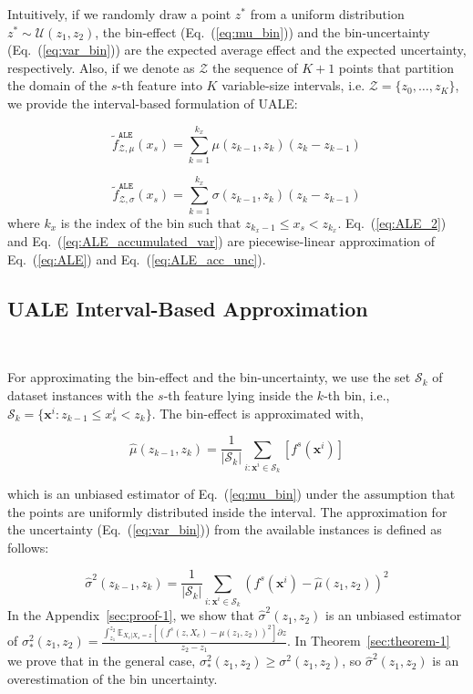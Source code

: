 \documentclass[twoside]{article}
\newcommand{\dfdx}{f^s}
\begin{document}
%
Intuitively, if we randomly draw a point \(z^*\) from a uniform
distribution \(z^* \sim \mathcal{U}(z_1, z_2)\), the bin-effect
(Eq.~(\ref{eq:mu_bin})) and the bin-uncertainty
(Eq.~(\ref{eq:var_bin})) are the expected average effect and the
expected uncertainty, respectively. Also, if we denote as
\(\mathcal{Z}\) the sequence of \(K+1\) points that partition the
domain of the \(s\)-th feature into \(K\) variable-size intervals,
i.e.  \(\mathcal{Z} = \{z_0, \ldots, z_K\}\), we provide the
interval-based formulation of UALE:

\begin{equation}
  \label{eq:ALE_2}
  \tilde{f}^{\mathtt{ALE}}_{\mathcal{Z}, \mu}(x_s) = \sum_{k=1}^{k_x} \mu(z_{k-1}, z_k) (z_k - z_{k-1})
\end{equation}

\begin{equation}
  \label{eq:ALE_accumulated_var}
  \tilde{f}^{\mathtt{ALE}}_{\mathcal{Z}, \sigma}(x_s) =  \sum_{k=1}^{k_x} \sigma(z_{k-1}, z_k) (z_k - z_{k-1})
\end{equation}
%
where \(k_x\) is the index of the bin such that
\( z_{k_x - 1} \leq x_s < z_{k_x}\). Eq.~(\ref{eq:ALE_2}) and
Eq.~(\ref{eq:ALE_accumulated_var}) are piecewise-linear approximation
of Eq.~(\ref{eq:ALE}) and Eq.~(\ref{eq:ALE_acc_unc}).

\subsection{UALE Interval-Based Approximation}
~\label{sec:UALE-approximation}

For approximating the bin-effect and the bin-uncertainty, we use the
set \(\mathcal{S}_k\) of dataset instances with the \(s\)-th feature
lying inside the \(k\)-th bin, i.e.,
\( \mathcal{S}_k= \{ \mathbf{x}^i : z_{k-1} \leq x^i_s < z_k \}
\). The bin-effect is approximated with,

\begin{equation}
  \label{eq:mu_bin_approx}
  \hat{\mu}(z_{k-1}, z_k) = \frac{1}{|\mathcal{S}_k|}
  \sum_{i:\mathbf{x}^i \in \mathcal{S}_k} \left [ \dfdx(\mathbf{x}^i)
  \right ]
\end{equation}

%
which is an unbiased estimator of Eq.~(\ref{eq:mu_bin}) under the
assumption that the points are uniformly distributed inside the
interval. The approximation for the uncertainty
(Eq.~(\ref{eq:var_bin})) from the available instances is defined as
follows:

%
\begin{equation}
  \label{eq:var_bin_approx}
  \hat{\sigma}^2(z_{k-1}, z_k) = \frac{1}{|\mathcal{S}_k|}
\sum_{i:\mathbf{x}^i \in \mathcal{S}_k} \left ( \dfdx(\mathbf{x}^i) -
  \hat{\mu}(z_1, z_2) \right )^2
\end{equation}
%
In the Appendix~\ref{sec:proof-1}, we show that
\(\hat{\sigma}^2(z_1, z_2)\) is an unbiased estimator of
\(\sigma^2_*(z_1, z_2) = \frac{\int_{z_1}^{z_2} \mathbb{E}_{X_c|X_s=z}
  \left [ (f^s(z, X_c) - \mu(z_1, z_2) )^2 \right] \partial z}{z_2 -
  z_1} \). In Theorem~\ref{sec:theorem-1} we prove that in the general
case, \(\sigma_*^2(z_1, z_2) \geq \sigma^2(z_1, z_2)\), so
\(\hat{\sigma}^2(z_1, z_2)\) is an overestimation of the bin
uncertainty.
\end{document}
